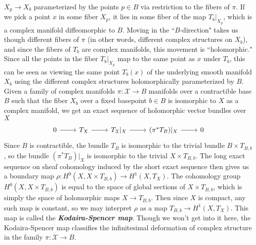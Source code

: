 \documentclass[psamsfonts, 12pt]{amsart}
\theoremstyle{definition}
\theoremstyle{remark}
\newcommand{\ib}[1]{\textbf{\textit{#1}}}
\begin{document}
$X_p \to X_b$ parameterized by the points $p \in B$ via restriction to the fibers
of $\pi$. If we pick a point $x$ in some fiber $X_p$, it lies in some fiber
of the map $T_b\vert_{X_p}$, which is a complex manifold diffeomorphic to $B$.
Moving in the ``$B$-direction" takes us though different fibers of $\pi$ (in other
words, different complex structures on $X_b$), and since the fibers of $T_b$ are
complex manifolds, this movement is ``holomorphic." Since all the points in the
fiber  $T_b\vert_{X_p}$ map to the same point as $x$ under $T_b$, this can be seen as
viewing the same point $T_b(x)$ of the underlying smooth manifold $X_b$ using the
different complex structures holomorphically parameterized by $B$. \\

Given a family of complex manifolds $\pi : \mathcal{X} \to B$
manifolds over a contractible base $B$ such that the fiber $X_b$ over a fixed
basepoint $b \in B$ is isomorphic to $X$ as a complex manifold, we get
an exact sequence of holomorphic vector bundles over $X$
\[\begin{tikzcd}
0 \ar[r] & T_X \ar[r] & T_\mathcal{X}\vert_X \ar[r] & (\pi^*T_B)\vert_X \ar[r] & 0
\end{tikzcd}\]
Since $B$ is contractible, the bundle $T_B$ is isomorphic to the trivial bundle
$B \times T_{B,b}$, so the bundle $(\pi^*T_B)\vert_X$ is isomorphic to the trivial
$X \times T_{B,b}$. The long exact sequence on sheaf cohomology induced by the short
exact sequence then gives us a boundary map
$\rho : H^0(X, X\times T_{B,b}) \to H^1(X,T_X)$. The cohomology group
$H^0(X, X\times T_{B,b})$ is equal to the space of global sections of
$X \times T_{B,b}$, which is simply the space of holomorphic maps $X \to T_{B,b}$.
Then since $X$ is compact, any such map is constant, so we may interpret $\rho$ as
a map $T_{B,b} \to H^1(X,T_X)$. This map is called the \ib{Kodaira-Spencer map}.
Though we won't get into it here, the Kodaira-Spencer map classifies the
infinitesimal deformation of complex structure in the family
$\pi : \mathcal{X} \to B$. \\
\end{document}
